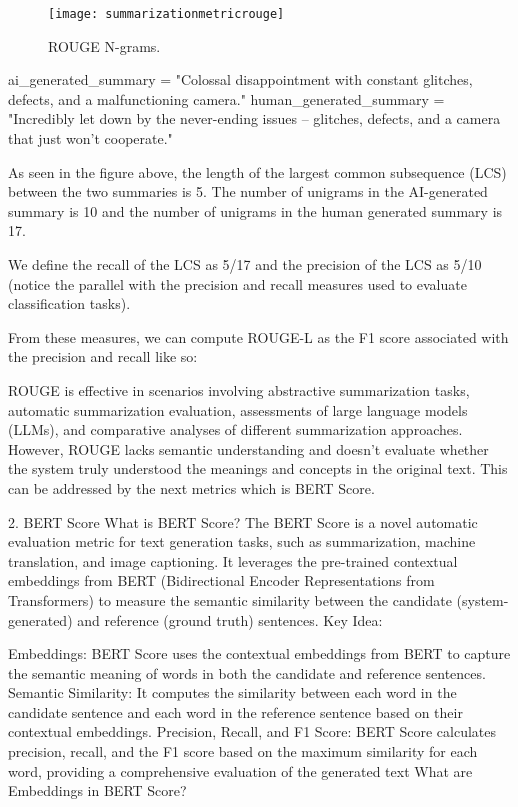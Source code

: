  	\begin{figure}
		\centering
		\texttt{[image: summarizationmetricrouge]}
		\caption[ROUGE N-grams]{ROUGE N-grams.}
		\label{fig:summarizationmetricrouge}
	\end{figure}


ai\_generated\_summary = "Colossal disappointment with constant glitches, defects, and a malfunctioning camera."
human\_generated\_summary = "Incredibly let down by the never-ending issues – glitches, defects, and a camera that just won't cooperate."

As seen in the figure above, the length of the largest common subsequence (LCS) between the two summaries is 5. The number of unigrams in the AI-generated summary is 10 and the number of unigrams in the human generated summary is 17.

We define the recall of the LCS as 5/17 and the precision of the LCS as 5/10 (notice the parallel with the precision and recall measures used to evaluate classification tasks).

From these measures, we can compute ROUGE-L as the F1 score associated with the precision and recall like so:

%
 

ROUGE is effective in scenarios involving abstractive summarization tasks, automatic summarization evaluation, assessments of large language models (LLMs), and comparative analyses of different summarization approaches. However, ROUGE lacks semantic understanding and doesn't evaluate whether the system truly understood the meanings and concepts in the original text. This can be addressed by the next metrics which is BERT Score.

2. BERT Score
What is BERT Score?
The BERT Score is a novel automatic evaluation metric for text generation tasks, such as summarization, machine translation, and image captioning. It leverages the pre-trained contextual embeddings from BERT (Bidirectional Encoder Representations from Transformers) to measure the semantic similarity between the candidate (system-generated) and reference (ground truth) sentences.
Key Idea:

Embeddings: BERT Score uses the contextual embeddings from BERT to capture the semantic meaning of words in both the candidate and reference sentences.
Semantic Similarity: It computes the similarity between each word in the candidate sentence and each word in the reference sentence based on their contextual embeddings.
Precision, Recall, and F1 Score: BERT Score calculates precision, recall, and the F1 score based on the maximum similarity for each word, providing a comprehensive evaluation of the generated text
What are Embeddings in BERT Score?

